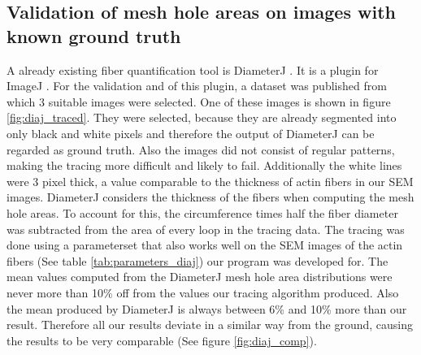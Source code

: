 \documentclass[12pt,english,twocolumn]{revtex4}
\begin{document}
\subsection{Validation of mesh hole areas on images with known ground truth}
A already existing fiber quantification tool is DiameterJ \cite{diaj}. It is a plugin for ImageJ \cite{imj}. For the validation and of this plugin, a dataset was published \cite{diaj_dataset} from which 3 suitable images were selected. One of these images is shown in figure \ref{fig:diaj_traced}. They were selected, because they are already segmented into only black and white pixels and therefore the output of DiameterJ can be regarded as ground truth. Also the images did not consist of regular patterns, making the tracing more difficult and likely to fail. Additionally the white lines were 3 pixel thick, a value comparable to the thickness of actin fibers in our SEM images. DiameterJ considers the thickness of the fibers when computing the mesh hole areas. To account for this, the circumference times half the fiber diameter was subtracted from the area of every loop in the tracing data. The tracing was done using a parameterset that also works well on the SEM images of the actin fibers (See table \ref{tab:parameters_diaj}) our program was developed for. The mean values computed from the DiameterJ mesh hole area distributions were never more than 10\% off from the values our tracing algorithm produced. Also the mean produced by DiameterJ is always between 6\% and 10\% more than our result. Therefore all our results deviate in a similar way from the ground, causing the results to be very comparable (See figure \ref{fig:diaj_comp}).
\end{document}
